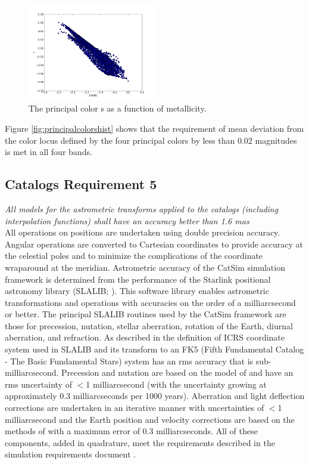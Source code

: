 \documentclass[]{article}
\begin{document}
\begin{figure} [ht]
\centering
\includegraphics[width=0.5\textwidth]{validation_figures/s_met.png}
\caption{The principal color s as a function of metallicity.\label{fig:sfeh}}
\end{figure}


Figure \ref{fig:principalcolorshist} shows that the requirement of mean deviation from the color locus defined by the four principal colors by less than 
0.02 magnitudes is met in all four bands.

\subsection{Catalogs Requirement 5}

{\it All models for the astrometric transforms applied to the catalogs (including interpolation functions) 
shall have an accuracy better than 1.6 mas}\\

All operations on positions are undertaken using double precision
accuracy. Angular operations are converted to Cartesian coordinates to
provide accuracy at the celestial poles and to minimize the
complications of the coordinate wraparound at the
meridian. Astrometric accuracy of the CatSim simulation framework is
determined from the performance of the Starlink positional astronomy
library (SLALIB; \citealt{wallace}). This software library enables
astrometric transformations and operations with accuracies on the
order of a milliarcsecond or better.  The principal SLALIB routines
used by the CatSim framework are those for precession, nutation,
stellar aberration, rotation of the Earth, diurnal aberration, and
refraction.  As described in \citet{wallace} the definition of ICRS
coordinate system used in SLALIB and its transform to an FK5 (Fifth
Fundamental Catalog - The Basic Fundamental Stars) system has an rms
accuracy that is sub-milliarcsecond. Precession and nutation are based
on the model of \citet{SF2001} and have an rms uncertainty of $<$1
milliarcsecond (with the uncertainty growing at approximately 0.3
milliarcseconds per 1000 years). Aberration and light deflection
corrections are undertaken in an iterative manner with uncertainties
of $<$1 milliarcsecond and the Earth position and velocity corrections
are based on the methods of \citep{stumpff} with a maximum error of
0.3 milliarcseconds. All of these components, added in quadrature,
meet the requirements described in the simulation requirements
document \citet{requirements}.
\end{document}
